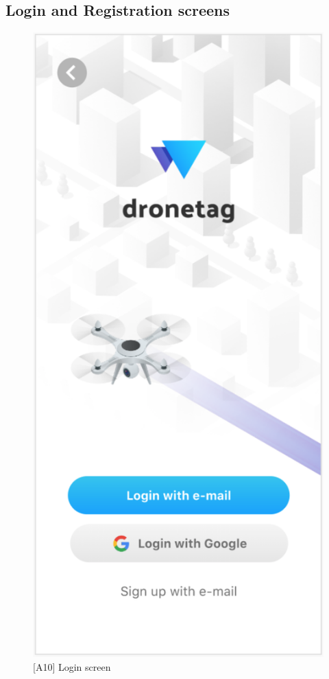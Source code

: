 \subsection{Login and Registration screens}\label{subsec:login-screen}


\begin{figure}
    \centering
    \includegraphics[width=.3\linewidth]{assets/user_interface_design/login/login_screen.png}
    \caption{[A10] Login screen}
    \label{fig:login_screen}
\end{figure}

